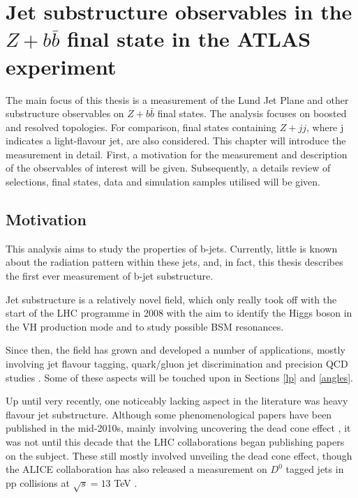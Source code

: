 \documentclass[10pt,a4paper]{book}
\author{Alberto Rescia}
\begin{document}
\chapter[$Z+b\bar{b}$ JSS]{Jet substructure observables in the $Z+b\bar{b}$ final state in the ATLAS experiment}

The main focus of this thesis is a measurement of the Lund Jet Plane and other substructure observables on $Z+b\bar{b}$ final states. The analysis focuses on boosted and resolved topologies. For comparison, final states containing $Z+jj$, where j indicates a light-flavour jet, are also considered. This chapter will introduce the measurement in detail. First, a motivation for the measurement and description of the observables of interest will be given. Subsequently, a details review of selections, final states, data and simulation samples utilised will be given. 

\section{Motivation}

This analysis aims to study the properties of b-jets. Currently, little is known about the radiation pattern within these jets, and, in  fact, this thesis describes the first ever measurement of b-jet substructure. 

Jet substructure is a relatively novel field, which only really took off with the start of the LHC programme in 2008 with the aim to identify the Higgs boson in the VH production mode and to study possible BSM resonances. 

Since then, the field has grown and developed a number of applications, mostly involving jet flavour tagging, quark/gluon jet discrimination and precision QCD studies \cite{Larkoski:2014pca, Fedkevych:2022mid, Cavallini:2021vot}. Some of these aspects will be touched upon in Sections \ref{lp} and \ref{angles}.

Up until very recently, one noticeably lacking aspect in the literature was heavy flavour jet substructure. Although some phenomenological papers have been published in the mid-2010s, mainly involving uncovering the dead cone effect \cite{Maltoni:2016ays, Cunqueiro:2018jbh}, it was not until this decade that the LHC collaborations began publishing papers on the subject. These still mostly involved unveiling the dead cone effect, though the ALICE collaboration has also released a measurement on $D^0$ tagged jets in pp collisions at $\sqrt{s} = 13$ TeV \cite{ALICE:2022phr}.
\end{document}

